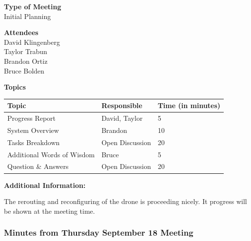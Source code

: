 \documentclass[pdftex,11pt]{article}
\begin{document}
{ \large \bfseries \hspace*{2 mm} Type of Meeting\\}
\hspace*{12 mm} Initial Planning
\vspace*{1.5mm}

{ \large \bfseries \hspace*{2 mm} Attendees\\}
\hspace*{12mm} David Klingenberg\\
\hspace*{12mm} Taylor Trabun\\
\hspace*{12mm} Brandon Ortiz\\
\hspace*{12mm} Bruce Bolden\\
\vspace*{1.5mm}

{ \large \bfseries \noindent Topics}
\vspace*{2.5mm}

\begin{tabular}{| l | l | l |}
  \hline
  \bfseries Topic & \bfseries Responsible & \bfseries Time (in minutes) \\ \hline
  Progress Report  & David, Taylor &  5 \\ \hline
  System Overview & Brandon & 10 \\ \hline
  Tasks Breakdown & Open Discussion & 20 \\ \hline
  Additional Words of Wisdom & Bruce & 5 \\ \hline
  Question \&  Answers  & Open Discussion & 20 \\ 
  \hline
\end{tabular}

\vspace*{2.5mm}
{ \large \bfseries \noindent Additional Information:}


The rerouting and reconfiguring of the drone is proceeding nicely.  It progress will be shown at the meeting time. 

\subsubsection[short]{Minutes from Thursday September 18 Meeting}
\end{document}
